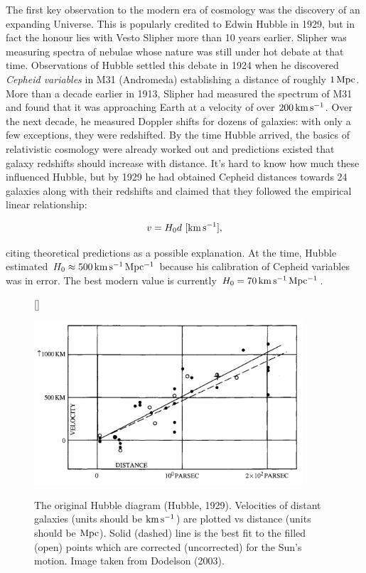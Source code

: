 \documentclass[a4paper,11pt]{article}
\begin{document}
{\noindent}The first key observation to the modern era of cosmology was the discovery of an expanding Universe. This is popularly credited to Edwin Hubble in 1929, but in fact the honour lies with Vesto Slipher more than 10 years earlier. Slipher was measuring spectra of nebulae whose nature was still under hot debate at that time. Observations of Hubble settled this debate in 1924 when he discovered \textit{Cepheid variables} in M31 (Andromeda) establishing a distance of roughly $1\,{\rm Mpc}$. More than a decade earlier in 1913, Slipher had measured the spectrum of M31 and found that it was approaching Earth at a velocity of over $200\,{\rm km\,s^{-1}}$. Over the next decade, he measured Doppler shifts for dozens of galaxies: with only a few exceptions, they were redshifted. By the time Hubble arrived, the basics of relativistic cosmology were already worked out and predictions existed that galaxy redshifts should increase with distance. It's hard to know how much these influenced Hubble, but by 1929 he had obtained Cepheid distances towards 24 galaxies along with their redshifts and claimed that they followed the empirical linear relationship:

\begin{align*}
    v = H_0 d ~ [{\rm km\,s^{-1}}],
\end{align*}

{\noindent}citing theoretical predictions as a possible explanation. At the time, Hubble estimated $H_0 \approx 500\,{\rm km\,s^{-1}\,Mpc^{-1}}$ because his calibration of Cepheid variables was in error. The best modern value is currently $H_0 = 70\,{\rm km\,s^{-1}\,Mpc^{-1}}$.

\begin{figure}[h]
    [\FBwidth]
    {\caption{\footnotesize{The original Hubble diagram (Hubble, 1929). Velocities of distant galaxies (units should be ${\rm km\,s^{-1}}$) are plotted vs distance (units should be ${\rm Mpc}$). Solid (dashed) line is the best fit to the filled (open) points which are corrected (uncorrected) for the Sun's motion. Image taken from Dodelson (2003).}}
    \label{fig:hubblediagram}}
    {\includegraphics[width=10cm]{figures/HubbleDiagram.png}}
\end{figure}
\end{document}
